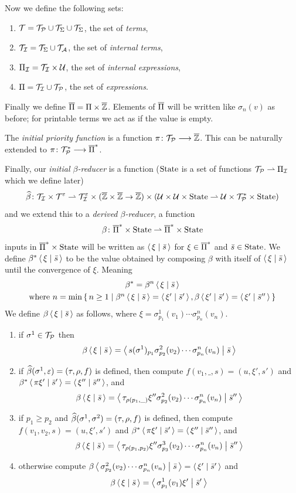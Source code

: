 \documentclass{llncs}
\begin{document}
Now we define the following sets:
\begin{enumerate}
    \item $\mathcal T=\mathcal T_{\mathcal P}\cup\mathcal T_{\Sigma}\cup\mathcal T_{\Sigma}$, the set of \textit{terms},
    \item $\mathcal T_{\mathcal I}=\mathcal T_{\Sigma}\cup\mathcal T_{\mathcal A}$, the set of \textit{internal terms},
    \item $\Pi_{\mathcal I}=\mathcal T_{\mathcal I}\times\mathcal U$, the set of \textit{internal expressions},
    \item $\Pi=\mathcal T_{\mathcal I}\cup\mathcal T_{\mathcal P}$, the set of \textit{expressions}.
\end{enumerate}
Finally we define $\overline{\Pi}=\Pi\times\overline{\mathbb Z}$.
Elements of $\overline{\Pi}$ will be written like $\sigma_n(v)$ as before; for printable terms we act as if the value is empty.

The \textit{initial priority function} is a function $\pi\colon\mathcal T_{\mathcal P}\longrightarrow\overline{\mathbb Z}$.
This can be naturally extended to $\pi\colon\mathcal T_{\mathcal P}^*\longrightarrow\overline{\Pi}^*$.

Finally, our \textit{initial $\beta$-reducer} is a function ($\mathrm{State}$ is a set of functions $\mathcal T_{\mathcal P}\rightharpoonup\Pi_{\mathcal I}$ which we define later)
\[ \widehat\beta\colon\mathcal T_{\mathcal I}\times\mathcal T^\varepsilon \rightharpoonup \mathcal T_{\mathcal I}^\varepsilon\times(\overline{\mathbb Z}\times\overline{\mathbb Z}\to\overline{\mathbb Z})\times(\mathcal U\times\mathcal U\times\mathrm{State}\rightharpoonup\mathcal U\times\mathcal T_{\mathcal P}^*\times\mathrm{State}) \]
and we extend this to a \textit{derived $\beta$-reducer}, a function
\[ \beta\colon\overline{\Pi}^*\times\mathrm{State} \rightharpoonup \overline{\Pi}^*\times\mathrm{State} \]
inputs in $\overline{\Pi}^*\times\mathrm{State}$ will be written as $\gen\xi[\bar s]$ for $\xi\in\overline{\Pi}^*$ and $\bar s\in\mathrm{State}$.
We define $\beta^*\gen\xi[\bar s]$ to be the value obtained by composing $\beta$ with itself of $\gen\xi[\bar s]$ until the convergence of $\xi$.
Meaning
\begin{multline*}
    \beta^* = \beta^n\gen\xi[\bar s]\\
    \hbox{where $n=\min\set{n\geq1}[{\beta^n\gen\xi[\bar s]=\gen{\xi'}[\bar s'],\beta\gen{\xi'}[\bar s']=\gen{\xi'}[\bar s'']}]$}
\end{multline*}
We define $\beta\gen\xi[\bar s]$ as follows, where $\xi=\sigma^1_{p_1}(v_1)\cdots\sigma^n_{p_n}(v_n)$.
\begin{enumerate}
    \item if $\sigma^1\in\mathcal T_{\mathcal P}$ then
    \[ \beta\gen\xi[\bar s] = \gen{s(\sigma^1)_{p_1}\sigma^2_{p_2}(v_2)\cdots\sigma^n_{p_n}(v_n)}[\bar s] \]
    \item if $\widehat\beta(\sigma^1,\varepsilon)=(\tau,\rho,f)$ is defined, then compute $f(v_1,\_,s)=(u,\xi',s')$ and $\beta^*\gen{\pi\xi'}[\bar s']=\gen{\xi''}[\bar s'']$, and
    \[ \beta\gen\xi[\bar s] = \gen{\tau_{\rho(p_1,\_)}\xi''\sigma^2_{p_2}(v_2)\cdots\sigma^n_{p_n}(v_n)}[\bar s''] \]
    \item if $p_1\geq p_2$ and $\widehat\beta(\sigma^1,\sigma^2)=(\tau,\rho,f)$ is defined, then compute $f(v_1,v_2,s)=(u,\xi',s')$ and $\beta^*\gen{\pi\xi'}[\bar s']=\gen{\xi''}[\bar s'']$, and
    \[ \beta\gen\xi[\bar s] = \gen{\tau_{\rho(p_1,p_2)}\xi''\sigma^3_{p_3}(v_2)\cdots\sigma^n_{p_n}(v_n)}[\bar s''] \]
    \item otherwise compute $\beta\gen{\sigma^2_{p_2}(v_2)\cdots\sigma^n_{p_n}(v_n)}[\bar s]=\gen{\xi'}[\bar s']$ and
    \[ \beta\gen\xi[\bar s] = \gen{\sigma^1_{p_1}(v_1)\xi'}[\bar s'] \]
\end{enumerate}
\end{document}
